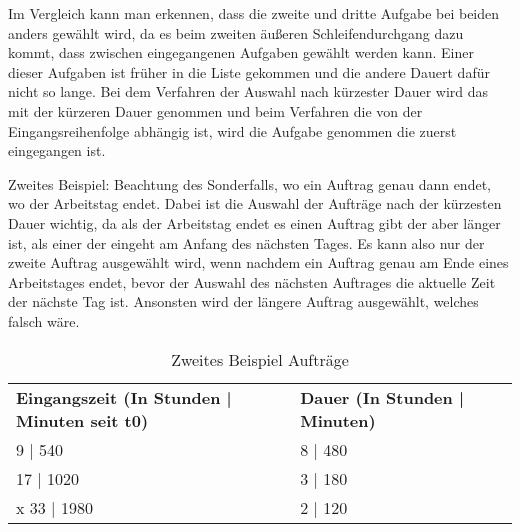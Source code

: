 \documentclass[a4paper,10pt,ngerman]{scrartcl}
\begin{document}
Im Vergleich kann man erkennen, dass die zweite und dritte Aufgabe bei beiden anders gewählt wird,
da es beim zweiten äußeren Schleifendurchgang dazu kommt, dass zwischen eingegangenen Aufgaben gewählt werden kann.
Einer dieser Aufgaben ist früher in die Liste gekommen und die andere Dauert dafür nicht so lange.
Bei dem Verfahren der Auswahl nach kürzester Dauer wird das mit der kürzeren Dauer genommen und
beim Verfahren die von der Eingangsreihenfolge abhängig ist,
wird die Aufgabe genommen die zuerst eingegangen ist.


Zweites Beispiel: Beachtung des Sonderfalls, wo ein Auftrag genau dann endet, wo der Arbeitstag endet.
Dabei ist die Auswahl der Aufträge nach der kürzesten Dauer wichtig,
da als der Arbeitstag endet es einen Auftrag gibt der aber länger ist,
als einer der eingeht am Anfang des nächsten Tages.
Es kann also nur der zweite Auftrag ausgewählt wird,
wenn nachdem ein Auftrag genau am Ende eines Arbeitstages endet,
bevor der Auswahl des nächsten Auftrages die aktuelle Zeit der nächste Tag ist.
Ansonsten wird der längere Auftrag ausgewählt, welches falsch wäre.

 \begin{table}[htb]
    \centering
    \begin{tabular}{lll}
    \textbf{Eingangszeit (In Stunden | Minuten seit t0)} & \textbf{Dauer (In Stunden | Minuten)} \\
    9 | 540 & 8 | 480 \\
    17 | 1020 & 3 | 180 \\
x    33 | 1980 & 2 | 120 \\
    \end{tabular}
    \caption{Zweites Beispiel Aufträge}
    \label{tab:Table1}
 \end{table}
\end{document}
